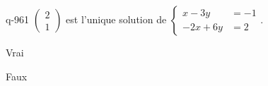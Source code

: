 \begin{truefalse}{q-961}
$\begin{pmatrix}2\\1\end{pmatrix}$ est l'unique solution de $\begin{cases}x-3y &= -1 \\ -2x+6y &= 2\end{cases}$.
\item Vrai
\item* Faux
\end{truefalse}

